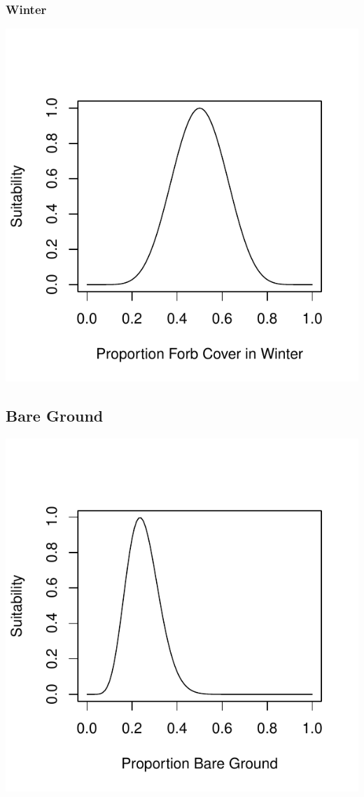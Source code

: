 \documentclass[12pt,letterpaper]{article}\usepackage{graphicx, color}
\makeatletter
\def\maxwidth{ %
  \ifdim\Gin@nat@width>\linewidth
    \linewidth
  \else
    \Gin@nat@width
  \fi
}
\newenvironment{knitrout}{}{} %
\makeatother
\begin{document}
\subsubsection{Winter}
\begin{knitrout}
\color{fgcolor}\includegraphics[width=\maxwidth]{figure/Forb_Cover_Roy_Win} 
\end{knitrout}

\subsection{Bare Ground}
\begin{knitrout}
\color{fgcolor}\includegraphics[width=\maxwidth]{figure/Bare_Ground_Roy} 
\end{knitrout}
\end{document}
